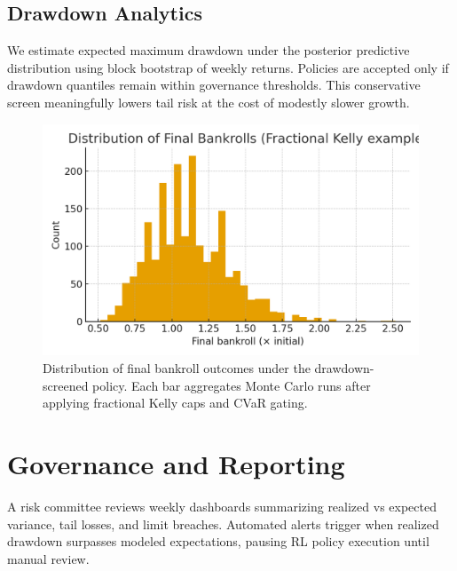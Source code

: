 \subsection{Drawdown Analytics}
We estimate expected maximum drawdown under the posterior predictive distribution using block bootstrap of weekly returns. Policies are accepted only if drawdown quantiles remain within governance thresholds. This conservative screen meaningfully lowers tail risk at the cost of modestly slower growth.

\begin{figure}[t]
  \centering
  \includegraphics[width=0.9\linewidth]{../figures/bankroll_hist.png}
  \caption[Final bankroll distribution]{Distribution of final bankroll outcomes under the drawdown-screened policy. Each bar aggregates Monte Carlo runs after applying fractional Kelly caps and CVaR gating.}
  \label{fig:bankroll-hist}
\end{figure}

\section{Governance and Reporting}
A risk committee reviews weekly dashboards summarizing realized vs expected variance, tail losses, and limit breaches. Automated alerts trigger when realized drawdown surpasses modeled expectations, pausing RL policy execution until manual review.


